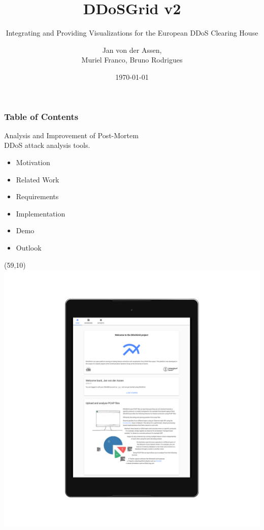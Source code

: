 \documentclass[fleqn]{beamer}
\title{DDoSGrid v2}
\subtitle{Integrating and Providing Visualizations for the European DDoS Clearing House}
\author{Jan von der Assen,\\ Muriel Franco, Bruno Rodrigues}
\institute[Master Thesis Midterm Presentation]{}
\date{\today}
\begin{document}
    \begin{frame}
      \titlepage
    \end{frame}
    
    \begin{frame}
      \frametitle{Table of Contents}
        Analysis and Improvement of Post-Mortem \\
        DDoS attack analysis tools.
        \begin{itemize}
          \item Motivation
          \item Related Work
          \item Requirements
          \item Implementation
          \item Demo
          \item Outlook
        \end{itemize}
           \begin{textblock}{20}(59,10)
          \includegraphics[scale=0.12]{images/google-nexus9-landscape.png}
          \end{textblock}
    \end{frame}
    
\end{document}
